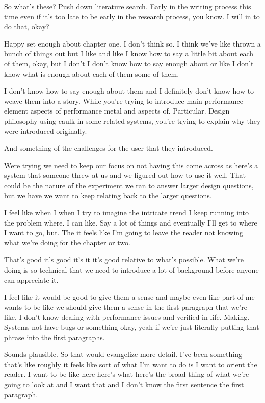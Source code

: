 \begin{subappendices}
So what's these? Push down literature search. Early in the writing process this time even if it's too late to be early in the research process, you know. I will in to do that, okay?

Happy set enough about chapter one. I don't think so. I think we've like thrown a bunch of things out but I like and like I know how to say a little bit about each of them, okay, but I don't I don't know how to say enough about or like I don't know what is enough about each of them some of them.

I don't know how to say enough about them and I definitely don't know how to weave them into a story. While you're trying to introduce main performance element aspects of performance metal and aspects of. Particular. Design philosophy using caulk in some related systems, you're trying to explain why they were introduced originally.

And something of the challenges for the user that they introduced.

Were trying we need to keep our focus on not having this come across as here's a system that someone threw at us and we figured out how to use it well. That could be the nature of the experiment we ran to answer larger design questions, but we have we want to keep relating back to the larger questions.

I feel like when I when I try to imagine the intricate trend I keep running into the problem where. I can like. Say a lot of things and eventually I'll get to where I want to go, but. The it feels like I'm going to leave the reader not knowing what we're doing for the chapter or two.

That's good it's good it's it it's good relative to what's possible. What we're doing is so technical that we need to introduce a lot of background before anyone can appreciate it.

I feel like it would be good to give them a sense and maybe even like part of me wants to be like we should give them a sense in the first paragraph that we're like, I don't know dealing with performance issues and verified in life. Making. Systems not have bugs or something okay, yeah if we're just literally putting that phrase into the first paragraphs.

Sounds plausible. So that would evangelize more detail. I've been something that's like roughly it feels like sort of what I'm want to do is I want to orient the reader. I want to be like here here's what here's the broad thing of what we're going to look at and I want that and I don't know the first sentence the first paragraph.


\end{subappendices}

